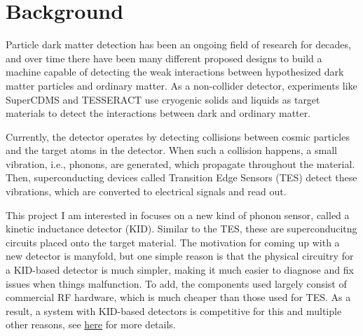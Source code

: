 \documentclass[10pt]{article}
\newcommand{\classcode}{Physics H195A}
\newcommand{\classname}{Physics Honors Thesis Proposal}
\renewcommand{\maketitle}{%
\hrule height4pt
\large{Yutong (Eric) Du \hfill \classcode}
\newline
\large{Proposal} \Large{\hfill \classname \hfill} \large{\today}
\hrule height4pt \vskip .7em
\small{Header styling inspired by CS 70: \url{https://www.eecs70.org/}}
\normalsize
}
\begin{document}
	\section{Background}

	Particle dark matter detection has been an ongoing field of research for 
	decades, and over time there have been many different proposed designs to build 
	a machine capable of detecting the weak interactions between hypothesized dark 
	matter particles and ordinary matter. As a non-collider detector, 
	experiments like SuperCDMS and TESSERACT use cryogenic solids and liquids 
	as target materials to detect the interactions between dark and ordinary 
	matter. 

	Currently, the detector operates by detecting collisions between cosmic particles 
	and the target atoms in the detector. When such a collision happens, a 
	small vibration, i.e., phonons, are generated, which propagate throughout the 
	material. Then, superconducting devices called Transition Edge Sensors (TES) detect 
	these vibrations, which are converted to electrical signals and read out. 

	This project I am interested in focuses on a new kind of phonon sensor, called a 
	kinetic inductance detector (KID).
	Similar to the TES, these are superconducitng circuits 
	placed onto the target material. 
	The motivation for coming up with a new detector is manyfold, but one simple reason 
	is that the physical circuitry for a KID-based detector is much simpler, making 
	it much easier to diagnose and fix issues when things malfunction. To add, 
	the components used largely consist of commercial RF hardware, which is much cheaper 
	than those used for TES. As a result, a system with KID-based detectors is 
	competitive for this and multiple other reasons, see \href{https://thesis.library.caltech.edu/15199/1/Chang_YenYung_2021.pdf}{here} for more details. 
\end{document}
